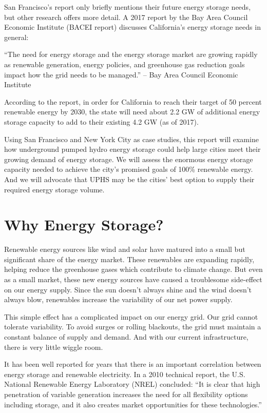 \documentclass[hidelinks,12pt,a4paper]{article}
\begin{document}
San Francisco's report only briefly mentions their future energy storage needs, but other research offers more detail. A 2017 report by the Bay Area Council Economic Institute (BACEI report) discusses California's energy storage needs in general:

\begin{displayquote}
“The need for energy storage and the energy storage market are growing rapidly as renewable generation, energy policies, and greenhouse gas reduction goals impact how the grid needs to be managed.”\cite{EnergyStorageCaliforniaClimateandEnergyGoals} --  Bay Area Council Economic Institute
\end{displayquote}

According to the report, in order for California to reach their target of 50 percent renewable energy by 2030, the state will need about 2.2 GW of additional energy storage capacity to add to their existing 4.2 GW (as of 2017).\cite{EnergyStorageCaliforniaClimateandEnergyGoals}


Using San Francisco and New York City as case studies, this report will examine how underground pumped hydro energy storage could help large cities meet their growing demand of energy storage. We will assess the enormous energy storage capacity needed to achieve the city's promised goals of 100\% renewable energy. And we will advocate that UPHS may be the cities' best option to supply their required energy storage volume.

\pagebreak[4]
\section{Why Energy Storage?}
Renewable energy sources like wind and solar have matured into a small but significant share of the energy market. These renewables are expanding rapidly, helping reduce the greenhouse gases which contribute to climate change. But even as a small market, these new energy sources have caused a troublesome side-effect on our energy supply. Since the sun doesn’t always shine and the wind doesn’t always blow, renewables increase the variability of our net power supply.

This simple effect has a complicated impact on our energy grid. Our grid cannot tolerate variability. To avoid surges or rolling blackouts, the grid must maintain a constant balance of supply and demand. And with our current infrastructure, there is very little wiggle room.

It has been well reported for years that there is an important correlation between energy storage and renewable electricity. In a 2010 technical report, the U.S. National Renewable Energy Laboratory (NREL) concluded: “It is clear that high penetration of variable generation increases the need for all flexibility options including storage, and it also creates market opportunities for these technologies.” \cite{TheRoleOfEnergyStorageWithRenewableElectricityGeneration}
\end{document}
